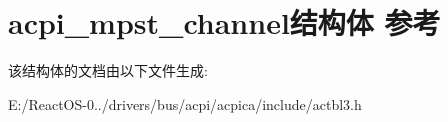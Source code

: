 \hypertarget{structacpi__mpst__channel}{}\section{acpi\+\_\+mpst\+\_\+channel结构体 参考}
\label{structacpi__mpst__channel}


该结构体的文档由以下文件生成\+:\begin{DoxyCompactItemize}
\item 
E\+:/\+React\+O\+S-\/0../drivers/bus/acpi/acpica/include/actbl3.\+h\end{DoxyCompactItemize}
